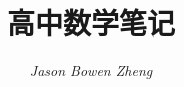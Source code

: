 \documentclass[a4paper, UTF8]{ctexbook}
\title{{\Huge 高中数学笔记}}
\author{\textit{Jason Bowen Zheng}}
\begin{document}
\frontmatter
\maketitle

\tableofcontents
\clearpage
\mainmatter
\raggedbottom



\end{document}
